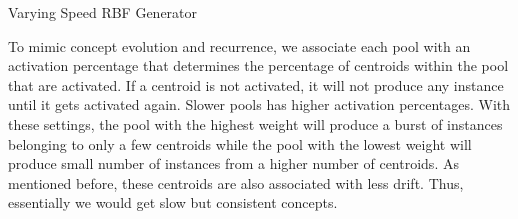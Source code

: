 \begin{algorithm}[htbp]
    \caption{Varying Speed RBF Generator}
    \label{alg:vsrbf}
    \DontPrintSemicolon
      
    
    
\end{algorithm}

To mimic concept evolution and recurrence, we associate each pool with an activation percentage that determines the percentage of centroids within the pool that are activated. If a centroid is not activated, it will not produce any instance until it gets activated again. Slower pools has higher activation percentages. With these settings, the pool with the highest weight will produce a burst of instances belonging to only a few centroids while the pool with the lowest weight will produce small number of instances from a higher number of centroids. As mentioned before, these centroids are also associated with less drift. Thus, essentially we would get slow but consistent concepts.


